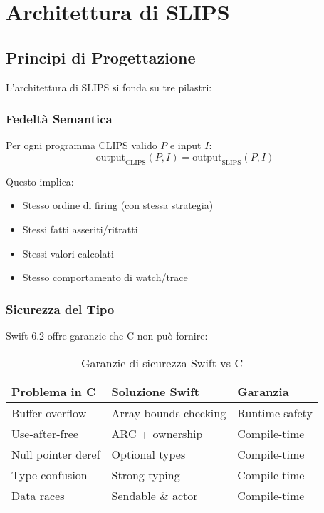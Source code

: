
\chapter{Architettura di SLIPS}
\label{cap:slips_arch}

\section{Principi di Progettazione}

L'architettura di SLIPS si fonda su tre pilastri:

\subsection{Fedeltà Semantica}

\begin{definizione}
Per ogni programma CLIPS valido $P$ e input $I$:
\begin{equation}
\text{output}_{\text{CLIPS}}(P, I) = \text{output}_{\text{SLIPS}}(P, I)
\end{equation}
\end{definizione}

Questo implica:
\begin{itemize}
\item Stesso ordine di firing (con stessa strategia)
\item Stessi fatti asseriti/ritratti
\item Stessi valori calcolati
\item Stesso comportamento di watch/trace
\end{itemize}

\subsection{Sicurezza del Tipo}

Swift 6.2 offre garanzie che C non può fornire:

\begin{table}[h]
\centering
\begin{tabular}{@{}lll@{}}
\toprule
\textbf{Problema in C} & \textbf{Soluzione Swift} & \textbf{Garanzia} \\
\midrule
Buffer overflow & Array bounds checking & Runtime safety \\
Use-after-free & ARC + ownership & Compile-time \\
Null pointer deref & Optional types & Compile-time \\
Type confusion & Strong typing & Compile-time \\
Data races & Sendable \& actor & Compile-time \\
\bottomrule
\end{tabular}
\caption{Garanzie di sicurezza Swift vs C}
\label{tab:safety}
\end{table}

